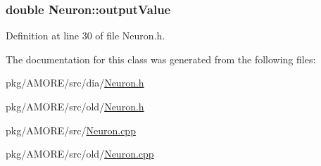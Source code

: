 \hypertarget{class_neuron_ada029047646c36e525a6a1b77cafc03c}{
\subsubsection[{outputValue}]{\setlength{\rightskip}{0pt plus 5cm}double {\bf Neuron::outputValue}}}
\label{class_neuron_ada029047646c36e525a6a1b77cafc03c}


Definition at line 30 of file Neuron.h.



The documentation for this class was generated from the following files:\begin{DoxyCompactItemize}
\item 
pkg/AMORE/src/dia/\hyperlink{dia_2_neuron_8h}{Neuron.h}\item 
pkg/AMORE/src/old/\hyperlink{old_2_neuron_8h}{Neuron.h}\item 
pkg/AMORE/src/\hyperlink{_neuron_8cpp}{Neuron.cpp}\item 
pkg/AMORE/src/old/\hyperlink{old_2_neuron_8cpp}{Neuron.cpp}\end{DoxyCompactItemize}
